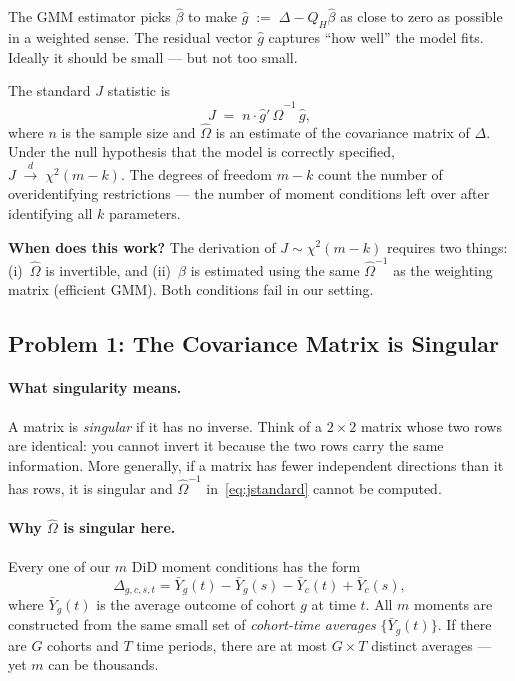 The GMM estimator picks $\hat\beta$ to make $\hat g \;{:=}\; \Delta - Q_H\hat\beta$
as close to zero as possible in a weighted sense.  The residual vector
$\hat g$ captures ``how well'' the model fits.  Ideally it should be
small --- but not too small.

The standard $J$ statistic is
\begin{equation}
  J \;=\; n\cdot \hat g'\,\hat\Omega^{-1}\,\hat g,
  \label{eq:jstandard}
\end{equation}
where $n$ is the sample size and $\hat\Omega$ is an estimate of the
covariance matrix of $\Delta$.  Under the null hypothesis that the model
is correctly specified, $J \;\overset{d}{\longrightarrow}\; \chi^2(m - k)$.
The degrees of freedom $m-k$ count the number of overidentifying
restrictions --- the number of moment conditions left over after
identifying all $k$ parameters.

\medskip
\noindent\textbf{When does this work?}  The derivation of $J\sim\chi^2(m-k)$
requires two things: (i)~$\hat\Omega$ is invertible, and (ii)~$\hat\beta$
is estimated using the same $\hat\Omega^{-1}$ as the weighting matrix
(efficient GMM).  Both conditions fail in our setting.

\subsection{Problem 1: The Covariance Matrix is Singular}
\label{subsec:singularity}

\paragraph{What singularity means.}
A matrix is \emph{singular} if it has no inverse.  Think of a $2\times2$
matrix whose two rows are identical: you cannot invert it because the
two rows carry the same information.  More generally, if a matrix has
fewer independent directions than it has rows, it is singular and
$\hat\Omega^{-1}$ in~\eqref{eq:jstandard} cannot be computed.

\paragraph{Why $\hat\Omega$ is singular here.}
Every one of our $m$ DiD moment conditions has the form
\begin{equation}
  \Delta_{g,c,s,t}
    = \bar Y_g(t) - \bar Y_g(s) - \bar Y_c(t) + \bar Y_c(s),
  \label{eq:did_form}
\end{equation}
where $\bar Y_g(t)$ is the average outcome of cohort $g$ at time $t$.
All $m$ moments are constructed from the same small set of
\emph{cohort-time averages} $\{\bar Y_g(t)\}$.  If there are $G$
cohorts and $T$ time periods, there are at most $G\times T$ distinct
averages --- yet $m$ can be thousands.

